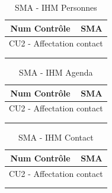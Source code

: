 

\begin{table}[H]
\centering
\caption{SMA - IHM Personnes}
\label{my-label}
\begin{tabular}{ll}
\hline
\multicolumn{1}{c}{Num Contrôle} & \multicolumn{1}{c}{SMA} \\ \hline
\multicolumn{2}{c}{CU2 - Affectation contact}              \\
                                 &                         \\
                                 &                         \\ \hline
\end{tabular}
\end{table}




\begin{table}[H]
\centering
\caption{SMA - IHM Agenda}
\label{my-label}
\begin{tabular}{ll}
\hline
\multicolumn{1}{c}{Num Contrôle} & \multicolumn{1}{c}{SMA} \\ \hline
\multicolumn{2}{c}{CU2 - Affectation contact}              \\
                                 &                         \\
                                 &                         \\ \hline
\end{tabular}
\end{table}



\begin{table}[H]
\centering
\caption{SMA - IHM Contact}
\label{my-label}
\begin{tabular}{ll}
\hline
\multicolumn{1}{c}{Num Contrôle} & \multicolumn{1}{c}{SMA} \\ \hline
\multicolumn{2}{c}{CU2 - Affectation contact}              \\
                                 &                         \\
                                 &                         \\ \hline
\end{tabular}
\end{table}